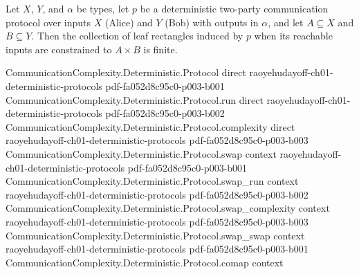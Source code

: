 \begin{lemma}
\label{CommunicationComplexity.Deterministic.Protocol.aux_finite}
\leanok
{}
Let $X$, $Y$, and $\alpha$ be types, let $p$ be a deterministic two-party communication
protocol over inputs $X$ (Alice) and $Y$ (Bob) with outputs in $\alpha$, and let $A
\subseteq X$ and $B \subseteq Y$. Then the collection of leaf rectangles induced by $p$
when its reachable inputs are constrained to $A \times B$ is finite.
\end{lemma}

\begin{lemma}
\label{CommunicationComplexity.Deterministic.Protocol.leafRectangles_card}
\leanok
{}
\proofstep
  {CommunicationComplexity.Deterministic.Protocol}
  {direct}
  {raoyehudayoff-ch01-deterministic-protocols}
  {pdf-fa052d8c95c0-p003-b001}
\proofstep
  {CommunicationComplexity.Deterministic.Protocol.run}
  {direct}
  {raoyehudayoff-ch01-deterministic-protocols}
  {pdf-fa052d8c95c0-p003-b002}
\proofstep
  {CommunicationComplexity.Deterministic.Protocol.complexity}
  {direct}
  {raoyehudayoff-ch01-deterministic-protocols}
  {pdf-fa052d8c95c0-p003-b003}
\proofstep
  {CommunicationComplexity.Deterministic.Protocol.swap}
  {context}
  {raoyehudayoff-ch01-deterministic-protocols}
  {pdf-fa052d8c95c0-p003-b001}
\proofstep
  {CommunicationComplexity.Deterministic.Protocol.swap_run}
  {context}
  {raoyehudayoff-ch01-deterministic-protocols}
  {pdf-fa052d8c95c0-p003-b002}
\proofstep
  {CommunicationComplexity.Deterministic.Protocol.swap_complexity}
  {context}
  {raoyehudayoff-ch01-deterministic-protocols}
  {pdf-fa052d8c95c0-p003-b003}
\proofstep
  {CommunicationComplexity.Deterministic.Protocol.swap_swap}
  {context}
  {raoyehudayoff-ch01-deterministic-protocols}
  {pdf-fa052d8c95c0-p003-b001}
\proofstep
  {CommunicationComplexity.Deterministic.Protocol.comap}
  {context}

\end{lemma}
